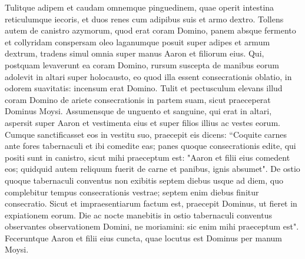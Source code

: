 \begin{biblechapter}
\verse Tulitque adipem et caudam omnemque pinguedinem, quae operit intestina reticulumque iecoris, et duos renes cum adipibus suis et armo dextro. 
\verse Tollens autem de canistro azymorum, quod erat coram Domino, panem absque fermento et collyridam conspersam oleo laganumque posuit super adipes et armum dextrum, 
\verse tradens simul omnia super manus Aaron et filiorum eius. Qui, postquam levaverunt ea coram Domino, 
\verse rursum suscepta de manibus eorum adolevit in altari super holocausto, eo quod illa essent consecrationis oblatio, in odorem suavitatis: incensum erat Domino. 
\verse Tulit et pectusculum elevans illud coram Domino de ariete consecrationis in partem suam, sicut praeceperat Dominus Moysi. 
\verse Assumensque de unguento et sanguine, qui erat in altari, aspersit super Aaron et vestimenta eius et super filios illius ac vestes eorum. 
\verse Cumque sanctificasset eos in vestitu suo, praecepit eis dicens: “Coquite carnes ante fores tabernaculi et ibi comedite eas; panes quoque consecrationis edite, qui positi sunt in canistro, sicut mihi praeceptum est: "Aaron et filii eius comedent eos; 
\verse quidquid autem reliquum fuerit de carne et panibus, ignis absumet". 
\verse De ostio quoque tabernaculi conventus non exibitis septem diebus usque ad diem, quo complebitur tempus consecrationis vestrae; septem enim diebus finitur consecratio. 
\verse Sicut et impraesentiarum factum est, praecepit Dominus, ut fieret in expiationem eorum. 
\verse Die ac nocte manebitis in ostio tabernaculi conventus observantes observationem Domini, ne moriamini: sic enim mihi praeceptum est". 
\verse Feceruntque Aaron et filii eius cuncta, quae locutus est Dominus per manum Moysi. 
\end{biblechapter}


